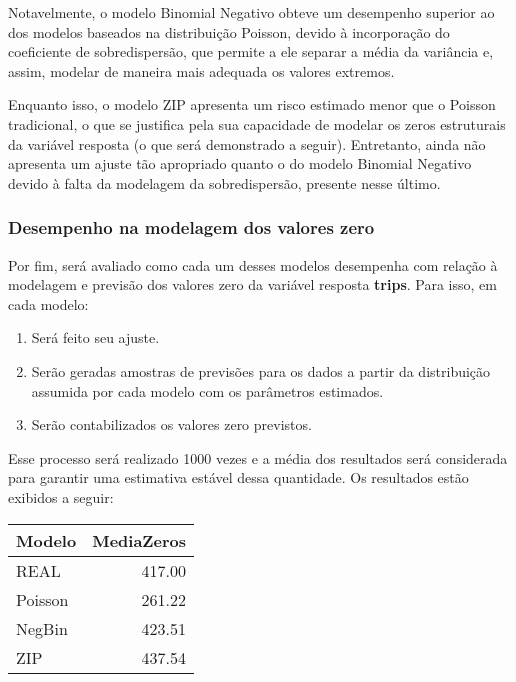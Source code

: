 \documentclass[
  twocolumn]{article}
\providecommand{\tightlist}{%
  \setlength{\itemsep}{0pt}\setlength{\parskip}{0pt}}
\begin{document}
Notavelmente, o modelo Binomial Negativo obteve um desempenho superior
ao dos modelos baseados na distribuição Poisson, devido à incorporação
do coeficiente de sobredispersão, que permite a ele separar a média da
variância e, assim, modelar de maneira mais adequada os valores
extremos.

Enquanto isso, o modelo ZIP apresenta um risco estimado menor que o
Poisson tradicional, o que se justifica pela sua capacidade de modelar
os zeros estruturais da variável resposta (o que será demonstrado a
seguir). Entretanto, ainda não apresenta um ajuste tão apropriado quanto
o do modelo Binomial Negativo devido à falta da modelagem da
sobredispersão, presente nesse último.

\subsubsection{Desempenho na modelagem dos valores
zero}\label{desempenho-na-modelagem-dos-valores-zero}

Por fim, será avaliado como cada um desses modelos desempenha com
relação à modelagem e previsão dos valores zero da variável resposta
\textbf{trips}. Para isso, em cada modelo:

\begin{enumerate}
\def\labelenumi{\arabic{enumi}.}
\tightlist
\item
  Será feito seu ajuste.
\item
  Serão geradas amostras de previsões para os dados a partir da
  distribuição assumida por cada modelo com os parâmetros estimados.
\item
  Serão contabilizados os valores zero previstos.
\end{enumerate}

Esse processo será realizado 1000 vezes e a média dos resultados será
considerada para garantir uma estimativa estável dessa quantidade. Os
resultados estão exibidos a seguir:

\begin{center}
\begin{tabular}{lr}
  \hline
Modelo & MediaZeros \\ 
  \hline
REAL & 417.00 \\ 
  Poisson & 261.22 \\ 
  NegBin & 423.51 \\ 
  ZIP & 437.54 \\ 
   \hline
\end{tabular}
\end{center}
\end{document}
